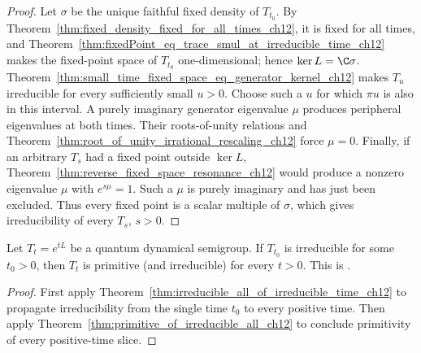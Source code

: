 \begin{proof}
    \leanok
    Let $\sigma$ be the unique faithful fixed density of $T_{t_0}$. By
    Theorem~\ref{thm:fixed_density_fixed_for_all_times_ch12}, it is fixed for all times, and
    Theorem~\ref{thm:fixedPoint_eq_trace_smul_at_irreducible_time_ch12} makes the fixed-point
    space of $T_{t_0}$ one-dimensional; hence $\ker L=\C\sigma$.
    Theorem~\ref{thm:small_time_fixed_space_eq_generator_kernel_ch12} makes
    $T_u$ irreducible for every sufficiently small $u>0$.  Choose such a $u$
    for which $\pi u$ is also in this interval.  A purely imaginary generator
    eigenvalue $\mu$ produces peripheral eigenvalues at both times.  Their
    roots-of-unity relations and
    Theorem~\ref{thm:root_of_unity_irrational_rescaling_ch12} force $\mu=0$.
    Finally, if an arbitrary $T_s$ had a fixed point outside $\ker L$,
    Theorem~\ref{thm:reverse_fixed_space_resonance_ch12} would produce a
    nonzero eigenvalue $\mu$ with $e^{s\mu}=1$.  Such a $\mu$ is purely
    imaginary and has just been excluded.  Thus every fixed point is a scalar
    multiple of $\sigma$, which gives irreducibility of every $T_s$, $s>0$.
\end{proof}

\begin{theorem}
    \label{thm:irreducible_semigroup_implies_primitive}
    \leanok
    Let $T_t=e^{tL}$ be a quantum dynamical semigroup.
    If $T_{t_0}$ is irreducible for some $t_0>0$, then
    $T_t$ is primitive (and irreducible) for every $t>0$.
    This is \cite[Proposition~7.5]{Wolf2012Quantum}.
\end{theorem}

\begin{proof}\leanok
    First apply Theorem~\ref{thm:irreducible_all_of_irreducible_time_ch12} to propagate
    irreducibility from the single time $t_0$ to every positive time. Then apply
    Theorem~\ref{thm:primitive_of_irreducible_all_ch12} to conclude primitivity of every
    positive-time slice.
\end{proof}

